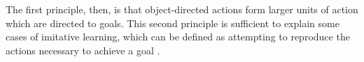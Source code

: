 \documentclass[12pt,\papersize]{extarticle}
\begin{document}
The first principle, then, is that object-directed actions form larger units of action which are directed to goals.  This second principle is sufficient to explain some cases of imitative learning, which can be defined as attempting to reproduce the actions necessary to achieve a goal \citep[]{en_1317}.  


































\small

\end{document}
